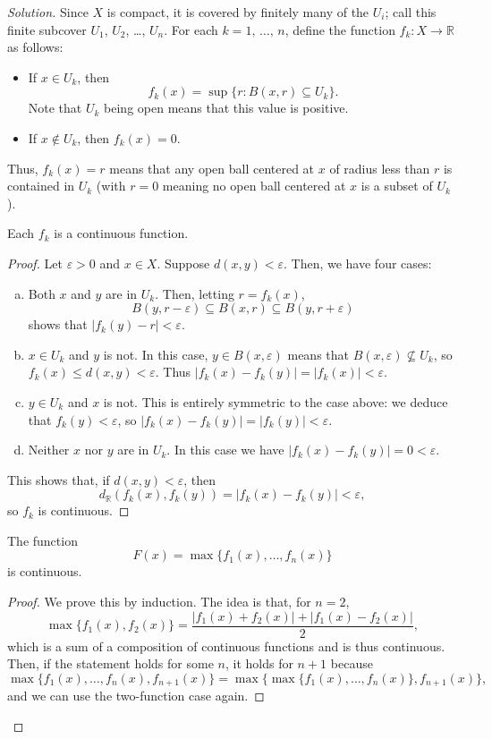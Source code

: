 \documentclass[11pt]{scrartcl}
\providecommand{\eps}{\varepsilon}
\providecommand{\RR}{\mathbb R}
\providecommand{\ii}{\item}
\newenvironment{soln}{\begin{proof}[Solution]}{\end{proof}}
\begin{document}
\begin{soln}
	Since $X$ is compact, it is covered by finitely many of the $U_i$;
	call this finite subcover $U_1$, $U_2$, \dots, $U_n$.
	For each $k = 1,\,\dots,\, n$, define the function
	$f_k\colon X\to\RR$ as follows:
	\begin{itemize}
		\ii If $x\in U_k$, then
		\[f_k(x) = \sup\{r : B(x, r)\subseteq U_k\}.\]
		Note that $U_k$ being open means that this value is positive.
		\ii If $x\notin U_k$, then $f_k(x) = 0$.
	\end{itemize}
	Thus, $f_k(x) = r$ means that
	any open ball centered at $x$ of radius less than $r$ is contained in $U_k$
	(with $r = 0$ meaning no open ball centered at $x$ is a subset of $U_k$).

	\begin{claim}
		Each $f_k$ is a continuous function.
	\end{claim}

	\begin{proof}
		Let $\eps > 0$ and $x\in X$. Suppose $d(x, y) < \eps$.
		Then, we have four cases:
		\begin{enumerate}[(a)]
			\ii Both $x$ and $y$ are in $U_k$. Then, letting $r = f_k(x)$,
			\[B(y,r-\eps) \subseteq B(x,r)\subseteq B(y,r+\eps)\]
			shows that $|f_k(y) - r| < \eps$.
			\ii $x\in U_k$ and $y$ is not.
			In this case, $y\in B(x, \eps)$ means that
			$B(x, \eps)\not\subseteq U_k$, so $f_k(x) \le d(x, y) < \eps$.
			Thus $|f_k(x) - f_k(y)| = |f_k(x)| < \eps$.
			\ii $y\in U_k$ and $x$ is not.
			This is entirely symmetric to the case above:
			we deduce that $f_k(y) < \eps$, so
			$|f_k(x) - f_k(y)| = |f_k(y)| < \eps$.
			\ii Neither $x$ nor $y$ are in $U_k$.
			In this case we have $|f_k(x) - f_k(y)| = 0 < \eps$.
		\end{enumerate}
		This shows that, if $d(x, y) < \eps$, then
		\[d_{\RR}(f_k(x), f_k(y)) = |f_k(x) - f_k(y)| < \eps,\]
		so $f_k$ is continuous.
	\end{proof}
	
	\begin{claim}
		The function
		\[F(x) = \max\{f_1(x), \dots, f_n(x)\}\]
		is continuous.
	\end{claim}

	\begin{proof}
		We prove this by induction.
		The idea is that, for $n = 2$,
		\[\max\{f_1(x), f_2(x)\} =
		\frac{|f_1(x) + f_2(x)| + |f_1(x) - f_2(x)|}{2},\]
		which is a sum of a composition of continuous functions
		and is thus continuous.
		Then, if the statement holds for some $n$,
		it holds for $n + 1$ because
		\[\max\{f_1(x), \dots, f_n(x), f_{n+1}(x)\} =
		\max\{\max\{f_1(x), \dots, f_n(x)\}, f_{n+1}(x)\},\]
		and we can use the two-function case again.
	\end{proof}


\end{soln}
\end{document}
